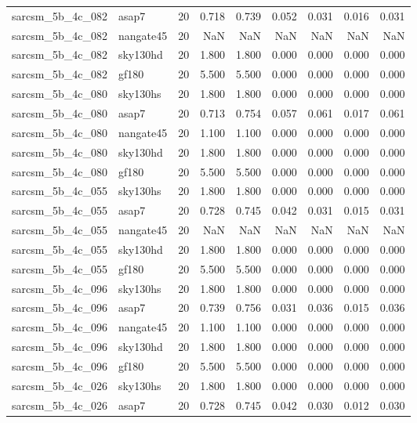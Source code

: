 \begin{tabular}{llrrrrrrr}
sarcsm\_5b\_4c\_082 & asap7 & 20 & 0.718 & 0.739 & 0.052 & 0.031 & 0.016 & 0.031 \\
sarcsm\_5b\_4c\_082 & nangate45 & 20 & NaN & NaN & NaN & NaN & NaN & NaN \\
sarcsm\_5b\_4c\_082 & sky130hd & 20 & 1.800 & 1.800 & 0.000 & 0.000 & 0.000 & 0.000 \\
sarcsm\_5b\_4c\_082 & gf180 & 20 & 5.500 & 5.500 & 0.000 & 0.000 & 0.000 & 0.000 \\
sarcsm\_5b\_4c\_080 & sky130hs & 20 & 1.800 & 1.800 & 0.000 & 0.000 & 0.000 & 0.000 \\
sarcsm\_5b\_4c\_080 & asap7 & 20 & 0.713 & 0.754 & 0.057 & 0.061 & 0.017 & 0.061 \\
sarcsm\_5b\_4c\_080 & nangate45 & 20 & 1.100 & 1.100 & 0.000 & 0.000 & 0.000 & 0.000 \\
sarcsm\_5b\_4c\_080 & sky130hd & 20 & 1.800 & 1.800 & 0.000 & 0.000 & 0.000 & 0.000 \\
sarcsm\_5b\_4c\_080 & gf180 & 20 & 5.500 & 5.500 & 0.000 & 0.000 & 0.000 & 0.000 \\
sarcsm\_5b\_4c\_055 & sky130hs & 20 & 1.800 & 1.800 & 0.000 & 0.000 & 0.000 & 0.000 \\
sarcsm\_5b\_4c\_055 & asap7 & 20 & 0.728 & 0.745 & 0.042 & 0.031 & 0.015 & 0.031 \\
sarcsm\_5b\_4c\_055 & nangate45 & 20 & NaN & NaN & NaN & NaN & NaN & NaN \\
sarcsm\_5b\_4c\_055 & sky130hd & 20 & 1.800 & 1.800 & 0.000 & 0.000 & 0.000 & 0.000 \\
sarcsm\_5b\_4c\_055 & gf180 & 20 & 5.500 & 5.500 & 0.000 & 0.000 & 0.000 & 0.000 \\
sarcsm\_5b\_4c\_096 & sky130hs & 20 & 1.800 & 1.800 & 0.000 & 0.000 & 0.000 & 0.000 \\
sarcsm\_5b\_4c\_096 & asap7 & 20 & 0.739 & 0.756 & 0.031 & 0.036 & 0.015 & 0.036 \\
sarcsm\_5b\_4c\_096 & nangate45 & 20 & 1.100 & 1.100 & 0.000 & 0.000 & 0.000 & 0.000 \\
sarcsm\_5b\_4c\_096 & sky130hd & 20 & 1.800 & 1.800 & 0.000 & 0.000 & 0.000 & 0.000 \\
sarcsm\_5b\_4c\_096 & gf180 & 20 & 5.500 & 5.500 & 0.000 & 0.000 & 0.000 & 0.000 \\
sarcsm\_5b\_4c\_026 & sky130hs & 20 & 1.800 & 1.800 & 0.000 & 0.000 & 0.000 & 0.000 \\
sarcsm\_5b\_4c\_026 & asap7 & 20 & 0.728 & 0.745 & 0.042 & 0.030 & 0.012 & 0.030 \\

\end{tabular}
